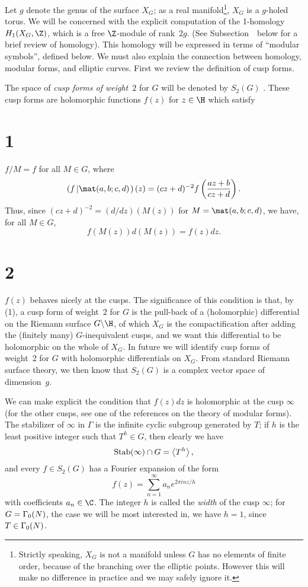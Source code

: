 Let $g$ denote the genus of the surface $X_G$; as a real
manifold\footnote{Strictly speaking, $X_G$ is not a manifold unless
$G$ has no elements of finite order, because of the branching over the
elliptic points.  However this will make no difference in practice and
we may safely ignore it.}, $X_G$ is a $g$-holed torus.  We will be
concerned with the explicit computation of the 1-homology
$H_1(X_G,\Z)$, which is a free $\Z$-module of rank~$2g$.  (See
Subsection~\dualcusphom\ below for a brief review of homology).  This homology
will be expressed in terms of ``modular symbols'', defined below.  We
must also explain the connection between homology, modular forms, and
elliptic curves.  First we review the definition of cusp forms.

The space of {\it cusp forms of weight\/}~$2$ for $G$ will be denoted
by $S_2(G)$ .  These cusp forms are holomorphic functions $f(z)$ for
$z\in\H$ which satisfy

\part{1} $f\slash M = f$ for all $M\in G$, where
$$
  \left(f\slash{\mat(a,b;c,d)}\right)(z) = (cz+d)^{-2}f\left(\frac{az+b}{cz+d}\right).
$$
Thus, since $(cz+d)^{-2}=(d/dz)(M(z))$ for
$M=\mat(a,b;c,d)$, we have, for all $M\in G$,
$$
   f(M(z))d(M(z)) = f(z)dz.
$$

\part{2} $f(z)$ behaves nicely at the cusps.  The significance of this
condition is that, by (1), a cusp form of weight~2 for $G$ is the
pull-back of a (holomorphic) differential on the Riemann surface
$G\backslash\H$, of which $X_G$ is the compactification after adding
the (finitely many) $G$-inequivalent cusps, and we want this
differential to be holomorphic on the whole of $X_G$.  In future we
will identify cusp forms of weight~2 for $G$ with holomorphic
differentials on $X_G$.   From standard Riemann surface theory, we
then know that $S_2(G)$ is a complex vector space of dimension~$g$.

We can make explicit the condition that $f(z)dz$ is holomorphic at the
cusp $\infty$ (for the other cusps, see one of the references on the
theory of modular forms).  The stabilizer of $\infty$ in $\Gamma$ is
the infinite cyclic subgroup generated by $T$; if $h$ is the least
positive integer such that $T^h\in G$, then clearly we have 
$$
  \hbox{Stab}(\infty) \cap G = \left<T^h\right>,
$$
and every $f\in S_2(G)$ has a Fourier expansion of the form
\neweq{\fourier}
$$
  f(z) = \sum_{n=1}^{\infty}a_ne^{2\pi inz/h} \tag{\fourier}
$$
with coefficients $a_n\in\C$.  The integer $h$ is called the {\it
width\/} of the cusp $\infty$; for $G=\G0(N)$, the case we will
be most interested in, we have $h=1$, since $T\in\G0(N)$.

